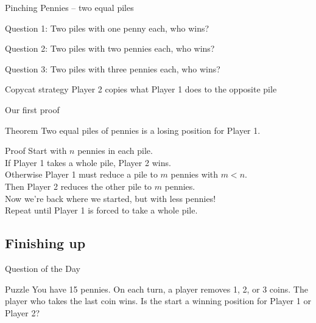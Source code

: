 \documentclass{beamer}
\begin{document}
\begin{frame}{Pinching Pennies -- two equal piles}
\pause
  \begin{block}{Question 1:}
    Two piles with one penny each, who wins?
  \end{block}
\pause
  \begin{block}{Question 2:}
    Two piles with two pennies each, who wins?
  \end{block}
\pause
  \begin{block}{Question 3:}
    Two piles with three pennies each, who wins?
  \end{block}
\pause
  \begin{block}{Copycat strategy}
     {\color{red}Player 2} copies what {\color{blue}Player 1} does to the opposite pile
  \end{block}
\end{frame}

\begin{frame}{Our first proof}
\pause
  \begin{block}{Theorem}
    Two equal piles of pennies is a losing position for {\color{blue}Player 1}.
  \end{block}
\pause
  \begin{block}{Proof}
\pause
    Start with $n$ pennies in each pile.\\
\pause
    If {\color{blue}Player 1} takes a whole pile, {\color{red}Player 2} wins.\\
\pause
    Otherwise {\color{blue}Player 1} must reduce a pile to $m$ pennies with $m<n$.\\
\pause
    Then {\color{red}Player 2} reduces the other pile to $m$ pennies.\\
\pause
    Now we're back where we started, but with less pennies!\\
\pause
    Repeat until {\color{blue}Player 1} is forced to take a whole pile.
  \end{block}
\end{frame}

\subsection{Finishing up}
\begin{frame}{Question of the Day}
  \begin{block}{Puzzle}
    You have 15 pennies. On each turn, a player removes 1, 2, or 3 coins.  The player who takes the last coin wins. 
    Is the start a winning position for {\color{blue}Player 1} or {\color{red}Player 2}?
  \end{block}
\end{frame}
\end{document}
